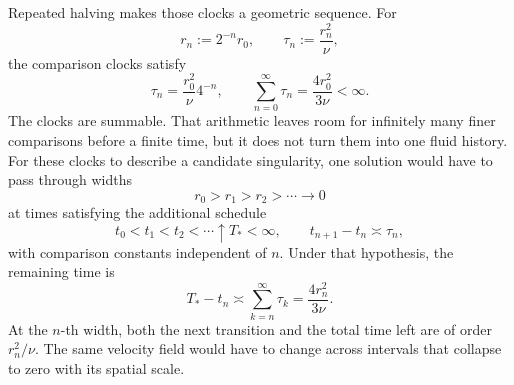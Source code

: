 
Repeated halving makes those clocks a geometric sequence.
For
\[
  r_n:=2^{-n}r_0,
  \qquad
  \tau_n:=\frac{r_n^2}{\nu},
\]
the comparison clocks satisfy
\[
  \tau_n
  =
  \frac{r_0^2}{\nu}4^{-n},
  \qquad
  \sum_{n=0}^{\infty}\tau_n
  =
  \frac{4r_0^2}{3\nu}
  <
  \infty.
\]
The clocks are summable.
That arithmetic leaves room for infinitely many finer comparisons before a finite time, but it does not turn them into one fluid history.
For these clocks to describe a candidate singularity, one \NavierStokes{} solution would have to pass through widths
\[
  r_0>r_1>r_2>\cdots\longrightarrow0
\]
at times satisfying the additional schedule
\[
  t_0<t_1<t_2<\cdots\uparrow T_*<\infty,
  \qquad
  t_{n+1}-t_n\asymp\tau_n,
\]
with comparison constants independent of \(n\).
Under that hypothesis, the remaining time is
\[
  T_*-t_n
  \asymp
  \sum_{k=n}^{\infty}\tau_k
  =
  \frac{4r_n^2}{3\nu}.
\]
At the \(n\)-th width, both the next transition and the total time left are of order \(r_n^2/\nu\).
The same velocity field would have to change across intervals that collapse to zero with its spatial scale.
